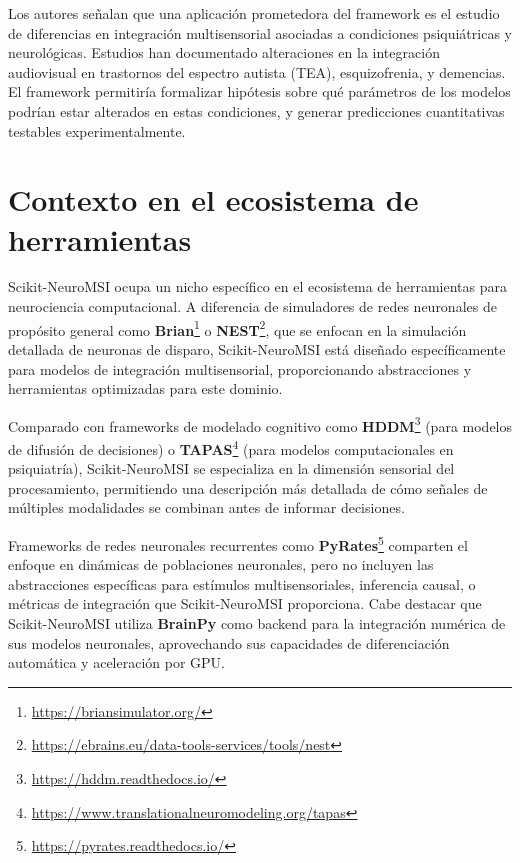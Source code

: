 Los autores señalan que una aplicación prometedora del framework es el estudio de diferencias en integración multisensorial asociadas a condiciones psiquiátricas y neurológicas. Estudios han documentado alteraciones en la integración audiovisual en trastornos del espectro autista (TEA), esquizofrenia, y demencias. El framework permitiría formalizar hipótesis sobre qué parámetros de los modelos podrían estar alterados en estas condiciones, y generar predicciones cuantitativas testables experimentalmente.


\section{Contexto en el ecosistema de herramientas}
\label{sec:snmsi_contexto}

Scikit-NeuroMSI ocupa un nicho específico en el ecosistema de herramientas para neurociencia computacional. A diferencia de simuladores de redes neuronales de propósito general como \textbf{Brian}\footnote{\url{https://briansimulator.org/}} o \textbf{NEST}\footnote{\url{https://ebrains.eu/data-tools-services/tools/nest}}, que se enfocan en la simulación detallada de neuronas de disparo, Scikit-NeuroMSI está diseñado específicamente para modelos de integración multisensorial, proporcionando abstracciones y herramientas optimizadas para este dominio.

Comparado con frameworks de modelado cognitivo como \textbf{HDDM}\footnote{\url{https://hddm.readthedocs.io/}} (para modelos de difusión de decisiones) o \textbf{TAPAS}\footnote{\url{https://www.translationalneuromodeling.org/tapas}} (para modelos computacionales en psiquiatría), Scikit-NeuroMSI se especializa en la dimensión sensorial del procesamiento, permitiendo una descripción más detallada de cómo señales de múltiples modalidades se combinan antes de informar decisiones.

Frameworks de redes neuronales recurrentes como \textbf{PyRates}\footnote{\url{https://pyrates.readthedocs.io/}} comparten el enfoque en dinámicas de poblaciones neuronales, pero no incluyen las abstracciones específicas para estímulos multisensoriales, inferencia causal, o métricas de integración que Scikit-NeuroMSI proporciona. Cabe destacar que Scikit-NeuroMSI utiliza \textbf{BrainPy} como backend para la integración numérica de sus modelos neuronales, aprovechando sus capacidades de diferenciación automática y aceleración por GPU.

